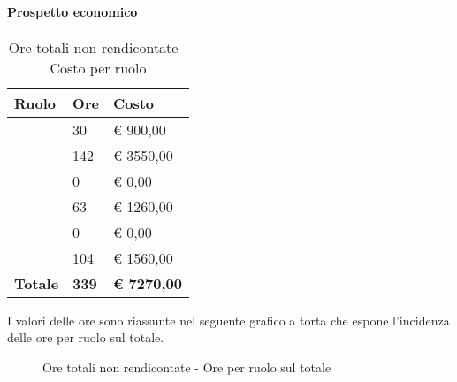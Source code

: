 			\paragraph{Prospetto economico} %
			\label{par:prospetto_economico}
				\begin{table}[!ht]
					\begin{center}
						\begin{tabularx}{0.65\textwidth}{|l|l|X|}
							\hline
							\textbf{Ruolo} & \textbf{Ore} & \textbf{Costo} \\
							\hline
							\roleProjectManager & 30 & \euro{} 900,00 \\
							\hline
							\roleAnalyst & 142 & \euro{} 3550,00 \\
							\hline
							\roleDesigner & 0 & \euro{} 0,00 \\
							\hline
							\roleAdministrator & 63 & \euro{} 1260,00 \\
							\hline
							\roleProgrammer & 0 & \euro{} 0,00 \\
							\hline
							\roleVerifier & 104 & \euro{} 1560,00 \\
							\hline
							\textbf{Totale} & \textbf{339} & \textbf{\euro{} 7270,00} \\
							\hline
						\end{tabularx}
					\end{center}
				\caption{Ore totali non rendicontate - Costo per ruolo}
				\end{table}
				
				\noindent
				I valori delle ore sono riassunte nel seguente grafico a torta che espone l’incidenza delle ore per ruolo sul totale.
				\begin{center}
					\begin{figure}[htbp]
					\vspace{0.8cm}
					\caption{Ore totali non rendicontate - Ore per ruolo sul totale}
					\end{figure}
				\end{center}

